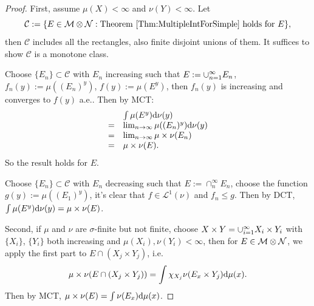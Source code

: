 \begin{proof}
    First, assume $\mu(X)<\infty$ and 
    $\nu(Y)<\infty$. Let 
    \begin{displaymath}
        \mathcal{C}:=\{E\in\mathcal{M}\otimes\mathcal{N}:
        \text{Theorem \ref{Thm:MultipleIntForSimple} holds for }E\},
    \end{displaymath}
    then $\mathcal{C}$ includes all the rectangles, also finite disjoint 
    unions of them. It suffices to show $\mathcal{C}$ is a monotone 
    class. 

    Choose $\{E_{n}\}\subset\mathcal{C}$ with $E_{n}$ increasing 
    such that $E:=\cup_{n=1}^{\infty}E_{n}$, $f_{n}(y):=\mu((E_{n})^{y})$, 
    $f(y):=\mu(E^{y})$, then $f_{n}(y)$ is increasing and converges 
    to $f(y)$ a.e.. Then by MCT:
    \begin{displaymath}
        \begin{array}{rl}
        &\int\mu(E^{y})\mathrm{d}\nu(y)\\
        =&\lim_{n\rightarrow\infty}
        \mu((E_{n})^{y})\mathrm{d}\nu(y)\\
        =&\lim_{n\rightarrow\infty}\mu\times\nu(E_{n})\\
        =&\mu\times\nu(E).
        \end{array}
    \end{displaymath}
    So the result holds for $E$. 
    
    Choose $\{E_{n}\}\subset\mathcal{C}$ with $E_{n}$ decreasing 
    such that $E:=\cap_{n}^{\infty}E_{n}$, choose the 
    function $g(y):=\mu((E_{1})^{y})$, it's clear that 
    $f\in\mathcal{L}^{1}(\nu)$ and $f_{n}\le g$. Then by DCT, 
    $\int\mu(E^{y})\mathrm{d}\nu(y)=\mu\times\nu(E)$.

    Second, if $\mu$ and $\nu$ are $\sigma$-finite but not finite, 
    choose $X\times Y=\cup_{i=1}^{\infty}X_{i}\times Y_{i}$ 
    with $\{X_{i}\}$, $\{Y_{i}\}$ both increasing and 
    $\mu(X_{i}),\nu(Y_{i})<\infty$, then for $E\in\mathcal{M}\otimes\mathcal{N}$, 
    we apply the first part to $E\cap (X_{j}\times Y_{j})$, 
    i.e. 
    \begin{displaymath}
        \mu\times\nu(E\cap(X_{j}\times Y_{j}))
        =\int\chi_{X_{j}}\nu(E_{x}\times Y_{j})\mathrm{d}\mu(x).
    \end{displaymath}
    Then by MCT, $\mu\times\nu(E)=\int\nu(E_{x})\mathrm{d}\mu(x)$.
\end{proof}
